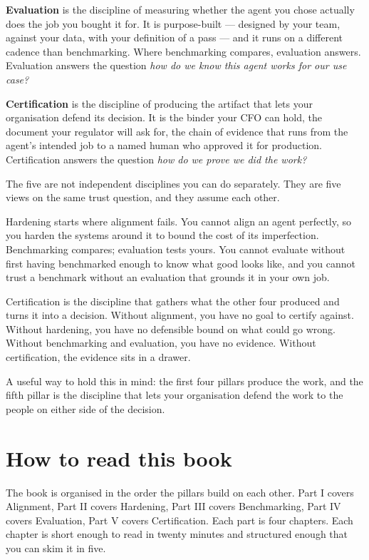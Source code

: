 \textbf{Evaluation} is the discipline of measuring whether the agent you chose actually does the job you bought it for. It is purpose-built --- designed by your team, against your data, with your definition of a pass --- and it runs on a different cadence than benchmarking. Where benchmarking compares, evaluation answers. Evaluation answers the question \textit{how do we know this agent works for our use case?}

\textbf{Certification} is the discipline of producing the artifact that lets your organisation defend its decision. It is the binder your CFO can hold, the document your regulator will ask for, the chain of evidence that runs from the agent's intended job to a named human who approved it for production. Certification answers the question \textit{how do we prove we did the work?}

The five are not independent disciplines you can do separately. They are five views on the same trust question, and they assume each other.

Hardening starts where alignment fails. You cannot align an agent perfectly, so you harden the systems around it to bound the cost of its imperfection. Benchmarking compares; evaluation tests yours. You cannot evaluate without first having benchmarked enough to know what good looks like, and you cannot trust a benchmark without an evaluation that grounds it in your own job.

Certification is the discipline that gathers what the other four produced and turns it into a decision. Without alignment, you have no goal to certify against. Without hardening, you have no defensible bound on what could go wrong. Without benchmarking and evaluation, you have no evidence. Without certification, the evidence sits in a drawer.

A useful way to hold this in mind: the first four pillars produce the work, and the fifth pillar is the discipline that lets your organisation defend the work to the people on either side of the decision.

\section{How to read this book}

The book is organised in the order the pillars build on each other. Part I covers Alignment, Part II covers Hardening, Part III covers Benchmarking, Part IV covers Evaluation, Part V covers Certification. Each part is four chapters. Each chapter is short enough to read in twenty minutes and structured enough that you can skim it in five.

